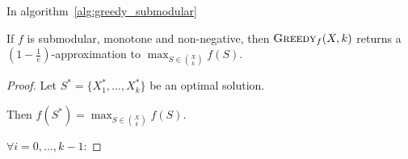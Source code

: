     In algorithm~\ref{alg:greedy_submodular}

    

    \begin{theorem}
        If $f$ is submodular, monotone and non-negative, then $\textsc{Greedy}_f(X,k)$ returns a $(1 - \frac{1}{e})$-approximation to $\max_{S \in \binom{X}{k}} f(S)$.
    \end{theorem}

    \begin{proof}
        Let $S^* = \{ X_1^*, \dots, X_k^* \}$ be an optimal solution.
        
        Then $f(S^*) = \max_{S \in \binom{X}{k}} f(S)$.

        $\forall i = 0, \dots, k-1$:


\end{proof}

